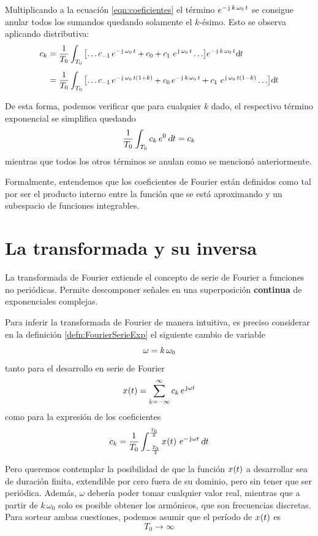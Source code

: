Multiplicando a la ecuación \ref{eqn:coeficientes} el término $e^{-\iu \, \kth \, \omega_0 \, t}$ se consigue anular todos los sumandos quedando solamente el $k$-ésimo.
Esto se observa aplicando distributiva:
\begin{align*}
    c_\kth &=
    \scale{0.95}{
    \frac{1}{T_0} \int_{T_0} \inBrackets{\dots c_{-1} \, e^{-\iu \, \omega_0 \, t} + c_0 + c_1 \, \, e^{\iu \, \omega_0 \, t} \dots} e^{-\iu \, \kth \, \omega_0 \, t} \dif t
    }
    \\[1ex]
    &= 
    \scale{0.95}{
    \frac{1}{T_0} \int_{T_0} \inBrackets{\dots c_{-1} \, e^{-\iu \, \omega_0 \, t \inParentheses{1 + k}} + c_0 \, e^{-\iu \, \kth \, \omega_0 \, t} + c_1 \, \, e^{\iu \, \omega_0 \, t \inParentheses{1 - k}} \dots} \dif t
    }
\end{align*}

De esta forma, podemos verificar que para cualquier $k$ dado, el respectivo término exponencial se simplifica quedando
\[
    \frac{1}{T_0} \int_{T_0} c_k \, e^0 \, \dif t = c_k
\]
mientras que todos los otros términos se anulan como se mencionó anteriormente.

Formalmente, entendemos que los coeficientes de Fourier están definidos como tal por ser el producto interno entre la función que se está aproximando y un subespacio de funciones integrables.

\section{La transformada y su inversa}

La transformada de Fourier extiende el concepto de serie de Fourier a funciones no periódicas.
Permite descomponer señales en una superposición \textbf{continua} de exponenciales complejas.

Para inferir la transformada de Fourier de manera intuitiva, es preciso considerar en la definición \ref{defn:FourierSerieExp} el siguiente cambio de variable
\[
    \omega = \kth \, \omega_0
\]
tanto para el desarrollo en serie de Fourier
\begin{equation}
    \fx[x]{t}
    = \sum_{\kth=-\infty}^\infty
    c_\kth \, \complexExp
    \label{eqn:serieFourierOmega}
\end{equation}
como para la expresión de los coeficientes
\[
    c_\kth =
    \frac{1}{T_0}
    \int_{-\frac{T_0}{2}}^{\frac{T_0}{2}} \fx[x]{t} \, e^{- \iu \omega t}
    \, \dif t
\]

Pero queremos contemplar la posibilidad de que la función $\fx[x]{t}$ a desarrollar sea de duración finita, extendible por cero fuera de su dominio, pero sin tener que ser periódica.
Además, $\omega$ debería poder tomar cualquier valor real, mientras que a partir de $k \, \omega_0$ solo es posible obtener los armónicos, que son frecuencias discretas.
Para sortear ambas cuestiones, podemos asumir que el período de $\fx[x]{t}$ es
\[
    T_0 \to \infty
\]

